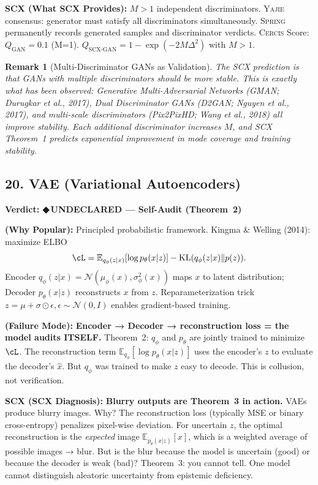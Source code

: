 \documentclass[12pt,a4paper]{article}
\newtheorem{remark}[theorem]{Remark}
\theoremstyle{definition}
\newcommand{\guilty}{{\color{guiltycolor}\textbf{◆\,UNDECLARED}}}
\newcommand{\Yajie}{\textsc{Yajie}}
\newcommand{\Spring}{\textsc{Spring}}
\newcommand{\Cercis}{\textsc{Cercis}}
\newcommand{\SCX}{\textsc{SCX}}
\DeclareMathOperator{\KL}{KL}
\newcommand{\E}{\mathbb{E}}
\newcommand{\cN}{\mathcal{N}}
\newcommand{\auditHeader}[1]{\medskip\noindent\textbf{\large #1}\medskip}
\newcommand{\whyPopular}{\noindent\textbf{ (Why Popular):} }
\newcommand{\whyFail}{\noindent\textbf{ (Failure Mode):} }
\newcommand{\whatMissing}{\noindent\textbf{SCX (What SCX Provides):} }
\newcommand{\diagnosis}{\noindent\textbf{SCX (SCX Diagnosis):} }
\begin{document}
\whatMissing{} $M>1$ independent discriminators. \Yajie{} consensus: generator must satisfy all discriminators simultaneously. \Spring{} permanently records generated samples and discriminator verdicts. \Cercis{} Score: $Q_{\text{GAN}} = 0.1$ (M=1). $Q_{\text{SCX-GAN}} = 1 - \exp(-2M\Delta^2)$ with $M>1$.

\begin{remark}[Multi-Discriminator GANs as Validation]
The \SCX{} prediction is that GANs with multiple discriminators should be more stable. This is exactly what has been observed: Generative Multi-Adversarial Networks (GMAN; Durugkar et al., 2017), Dual Discriminator GANs (D2GAN; Nguyen et al., 2017), and multi-scale discriminators (Pix2PixHD; Wang et al., 2018) all improve stability. Each additional discriminator increases $M$, and \SCX{} Theorem~1 predicts exponential improvement in mode coverage and training stability.
\end{remark}

\subsection{20. VAE (Variational Autoencoders) }

\auditHeader{Verdict: \guilty{} — Self-Audit (Theorem~2)}

\whyPopular{} Principled probabilistic framework. Kingma \& Welling (2014): maximize ELBO
\[
\cL = \E_{q_\phi(z|x)}[\log p_\theta(x|z)] - \KL(q_\phi(z|x) \| p(z)).
\]
Encoder $q_\phi(z|x) = \cN(\mu_\phi(x), \sigma_\phi^2(x))$ maps $x$ to latent distribution; Decoder $p_\theta(x|z)$ reconstructs $x$ from $z$. Reparameterization trick $z = \mu + \sigma \odot \epsilon, \epsilon \sim \cN(0, I)$ enables gradient-based training.

\whyFail{} \textbf{Encoder → Decoder → reconstruction loss = the model audits ITSELF.} Theorem~2: $q_\phi$ and $p_\theta$ are jointly trained to minimize $\cL$. The reconstruction term $\E_{q_\phi}[\log p_\theta(x|z)]$ uses the encoder's $z$ to evaluate the decoder's $\hat{x}$. But $q_\phi$ was trained to make $z$ easy to decode. This is collusion, not verification.

\diagnosis{} \textbf{Blurry outputs are Theorem~3 in action.} VAEs produce blurry images. Why? The reconstruction loss (typically MSE or binary cross-entropy) penalizes pixel-wise deviation. For uncertain $z$, the optimal reconstruction is the \textit{expected} image $\E_{p_\theta(x|z)}[x]$, which is a weighted average of possible images → blur. But is the blur because the model is uncertain (good) or because the decoder is weak (bad)? Theorem~3: you cannot tell. One model cannot distinguish aleatoric uncertainty from epistemic deficiency.
\end{document}
